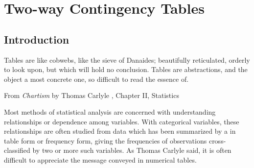 \documentclass[10pt,krantz2]{krantz}\usepackage[]{graphicx}\usepackage[]{color}
\begin{document}













\chapter{Two-way Contingency Tables}\label{ch:twoway}


\section{Introduction}\label{sec:twoway-intro}
\epigraph{Tables are like cobwebs, like the
sieve of Danaides; beautifully reticulated, orderly to look upon, but
which will hold no conclusion. Tables are abstractions, and the object a most
concrete one, so difficult to read the essence of.}{From \emph{Chartism} by Thomas Carlyle \citeyearpar{Carlyle:1840}, Chapter II, Statistics}

Most methods of statistical analysis are concerned with understanding
relationships or dependence among variables.
With categorical variables, these relationships are often
studied from data which has been
summarized by a 
in table form or frequency form,
giving the frequencies of observations cross-classified
by two or more such variables. As Thomas Carlyle said, it is often difficult
to appreciate the message conveyed in numerical tables.
\end{document}

